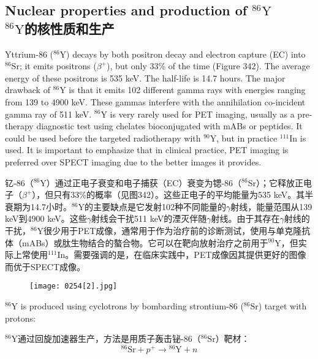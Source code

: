 \documentclass[dvipsnames, svgnames,a4paper,11pt]{article}
\begin{document}
\subsection{Nuclear properties and production of \(\mathrm{^{86}Y}\)\\ \(\mathrm{^{86}Y}\)的核性质和生产}  

Yttrium-86 (\(\mathrm{^{86}Y}\)) decays by both positron decay and electron capture (EC) into \(\mathrm{^{86}Sr}\); it emits positrons (\(\beta^{+}\)), but only 33\% of the time (Figure 342). The average energy of these positrons is 535 keV. The half-life is 14.7 hours. The major drawback of \(\mathrm{^{86}Y}\) is that it emits 102 different gamma rays with energies ranging from 139 to 4900 keV. These gammas interfere with the annihilation co-incident gamma ray of 511 keV. \(\mathrm{^{86}Y}\) is very rarely used for PET imaging, usually as a pre-therapy diagnostic test using chelates bioconjugated with mABs or peptides. It could be used before the targeted radiotherapy with \(\mathrm{^{90}Y}\), but in practice \(\mathrm{^{111}In}\) is used. It is important to emphasize that in clinical practice, PET imaging is preferred over SPECT imaging due to the better images it provides.  

钇-86（\(\mathrm{^{86}Y}\)）通过正电子衰变和电子捕获（EC）衰变为锶-86（\(\mathrm{^{86}Sr}\)）；它释放正电子（\(\beta^{+}\)），但只有33\%的概率（见图342）。这些正电子的平均能量为535 keV。其半衰期为14.7小时。\(\mathrm{^{86}Y}\)的主要缺点是它发射102种不同能量的$\gamma$射线，能量范围从139 keV到4900 keV。这些$\gamma$射线会干扰511 keV的湮灭伴随$\gamma$射线。由于其存在$\gamma$射线的干扰，\(\mathrm{^{86}Y}\)很少用于PET成像，通常用于作为治疗前的诊断测试，使用与单克隆抗体（mABs）或肽生物结合的螯合物。它可以在靶向放射治疗之前用于\(\mathrm{^{90}Y}\)，但实际上常使用\(\mathrm{^{111}In}\)。需要强调的是，在临床实践中，PET成像因其提供更好的图像而优于SPECT成像。

\begin{figure}[h]
	\centering
    \texttt{[image: 0254[2].jpg]}  
     \label{fig342}
\end{figure}

\(\mathrm{^{86}Y}\) is produced using cyclotrons by bombarding strontium-86 (\(\mathrm{^{86}Sr}\)) target with protons:

\(\mathrm{^{86}Y}\)通过回旋加速器生产，方法是用质子轰击铋-86（\(\mathrm{^{86}Sr}\)）靶材：
\[
\mathrm{^{86}Sr} + p^{+} \rightarrow \mathrm{^{86}Y} + n
\]
\end{document}
